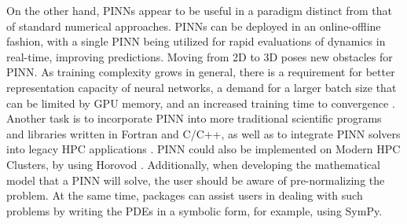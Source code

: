 \documentclass[pdflatex,sn-basic]{sn-jnl}%
\theoremstyle{thmstyleone}%
\theoremstyle{thmstyletwo}%
\theoremstyle{thmstylethree}%
\begin{document}
On the other hand, PINNs appear to be useful in a paradigm distinct from that of standard numerical approaches.
PINNs can be deployed in an online-offline fashion, with a single PINN being utilized for rapid evaluations of dynamics in real-time, improving predictions.%
%
Moving from 2D to 3D poses new obstacles for PINN. As training complexity grows in general, there is a requirement for better representation capacity of neural networks, a demand for a larger batch size that can be limited by GPU memory, and an increased training time to convergence \citep{Nan2021_ProgressTowardsSolving_HenNHN}. 
%
Another task is to incorporate PINN into more traditional scientific programs and libraries written in Fortran and C/C++, as well as to integrate PINN solvers into legacy HPC applications \citep{Mar2021_OldNewCan_Mar}.
PINN could also be implemented on Modern HPC Clusters, by using  Horovod \citep{Ser2018_HorovodFastEasy_DelSDB}.
Additionally, when developing the mathematical model that a PINN will solve, the user should be aware of pre-normalizing the problem. At the same time, packages can assist users in dealing with such problems by writing the PDEs in a symbolic form, for example, using SymPy.
\noindent
\\
\end{document}
